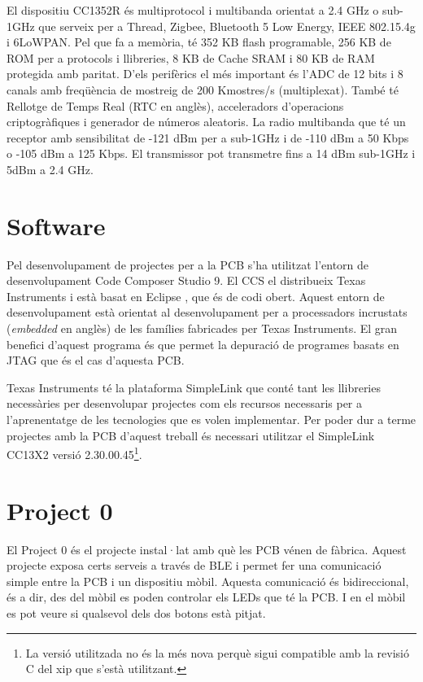 El dispositiu CC1352R és multiprotocol i multibanda orientat a 2.4 GHz o sub-1GHz que serveix per a Thread, Zigbee, Bluetooth 5 Low Energy, IEEE 802.15.4g i 6LoWPAN.
Pel que fa a memòria, té 352 KB flash programable, 256 KB de ROM per a protocols i llibreries, 8 KB de Cache SRAM i 80 KB de RAM protegida amb paritat.
D'els perifèrics el més important és l'ADC de 12 bits i 8 canals amb freqüència de mostreig de 200 Kmostres/s (multiplexat). També té Rellotge de Temps Real (RTC en anglès), acceleradors d'operacions criptogràfiques i generador de números aleatoris.
La radio multibanda que té un receptor amb sensibilitat de -121 dBm per a sub-1GHz i de -110 dBm a 50 Kbps o -105 dBm a 125 Kbps. El transmissor pot transmetre fins a 14 dBm sub-1GHz i 5dBm a 2.4 GHz.


\section{Software}
Pel desenvolupament de projectes per a la PCB s'ha utilitzat l'entorn de desenvolupament Code Composer Studio 9. 
El CCS el distribueix Texas Instruments i està basat en Eclipse \cite{eclipse}, que és de codi obert.
Aquest entorn de desenvolupament està orientat al desenvolupament per a processadors incrustats (\textit{embedded} en anglès) de les famílies fabricades per Texas Instruments.
El gran benefici d'aquest programa és que permet la depuració de programes basats en JTAG que és el cas d'aquesta PCB.

Texas Instruments té la plataforma SimpleLink que conté tant les llibreries necessàries per desenvolupar projectes com els recursos necessaris per a l'aprenentatge de les tecnologies que es volen implementar.
Per poder dur a terme projectes amb la PCB d'aquest treball és necessari utilitzar el SimpleLink CC13X2 versió 2.30.00.45\footnote{La versió utilitzada no és la més nova perquè sigui compatible amb la revisió C del xip que s'està utilitzant.}.

\section{Project 0}
El Project 0 és el projecte instal·lat amb què les PCB vénen de fàbrica.
Aquest projecte exposa certs serveis a través de BLE i permet fer una comunicació simple entre la PCB i un dispositiu mòbil.
Aquesta comunicació és bidireccional, és a dir, des del mòbil es poden controlar els LEDs que té la PCB.
I en el mòbil es pot veure si qualsevol dels dos botons està pitjat.

